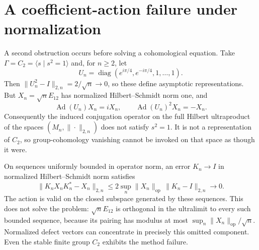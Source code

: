 \documentclass[11pt]{article}
\newcommand{\op}{\mathrm{op}}
\begin{document}
\section{A coefficient-action failure under normalization}
A second obstruction occurs before solving a cohomological equation. Take $\Gamma=C_2=\langle s\mid s^2=1\rangle$ and, for $n\geq2$, let
\[
U_n=\operatorname{diag}(e^{i\pi/4},e^{-i\pi/4},1,\ldots,1).
\]
Then $\|U_n^2-I\|_{2,n}=2/\sqrt n\to0$, so these define asymptotic representations. But $X_n=\sqrt n E_{12}$ has normalized Hilbert--Schmidt norm one, and
\[
\operatorname{Ad}(U_n)X_n=iX_n,
\qquad \operatorname{Ad}(U_n)^2X_n=-X_n.
\]
Consequently the induced conjugation operator on the full Hilbert ultraproduct of the spaces $(M_n,\|\cdot\|_{2,n})$ does not satisfy $s^2=1$. It is not a representation of $C_2$, so group-cohomology vanishing cannot be invoked on that space as though it were.

On sequences uniformly bounded in operator norm, an error $K_n\to I$ in normalized Hilbert--Schmidt norm satisfies
\[
\|K_nX_nK_n^*-X_n\|_{2,n}
\leq2\sup_n\|X_n\|_\op\,\|K_n-I\|_{2,n}\to0.
\]
The action is valid on the closed subspace generated by these sequences. This does not solve the problem: $\sqrt nE_{12}$ is orthogonal in the ultralimit to every such bounded sequence, because its pairing has modulus at most $\sup_n\|X_n\|_\op/\sqrt n$. Normalized defect vectors can concentrate in precisely this omitted component. Even the stable finite group $C_2$ exhibits the method failure.
\end{document}
